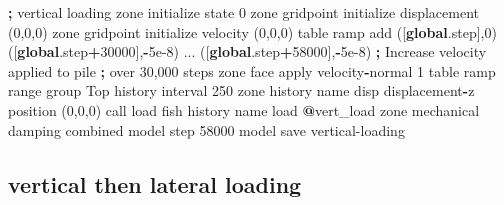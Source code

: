 \documentclass[a4paper, nobind]{templates/ociamthesis}
\newenvironment{Shaded}{\begin{snugshade}}{\end{snugshade}}
\newcommand{\BuiltInTok}[1]{#1}
\newcommand{\DecValTok}[1]{\textcolor[rgb]{0.00,0.00,0.81}{#1}}
\newcommand{\FloatTok}[1]{\textcolor[rgb]{0.00,0.00,0.81}{#1}}
\newcommand{\KeywordTok}[1]{\textcolor[rgb]{0.13,0.29,0.53}{\textbf{#1}}}
\newcommand{\NormalTok}[1]{#1}
\newcommand{\OperatorTok}[1]{\textcolor[rgb]{0.81,0.36,0.00}{\textbf{#1}}}
\newcommand{\StringTok}[1]{\textcolor[rgb]{0.31,0.60,0.02}{#1}}
\renewenvironment{Shaded}
{
  \vspace{10pt}%
  \begin{snugshade}%
}{%
  \end{snugshade}%
  \vspace{8pt}%
}
\begin{document}
\begin{Shaded}
\begin{Highlighting}[]
\OperatorTok{;}\NormalTok{ vertical loading}
\NormalTok{zone initialize state }\DecValTok{0}
\NormalTok{zone gridpoint initialize displacement (}\DecValTok{0}\NormalTok{,}\DecValTok{0}\NormalTok{,}\DecValTok{0}\NormalTok{)}
\NormalTok{zone gridpoint initialize velocity     (}\DecValTok{0}\NormalTok{,}\DecValTok{0}\NormalTok{,}\DecValTok{0}\NormalTok{) }
\NormalTok{table }\StringTok{\textquotesingle{}ramp\textquotesingle{}}\NormalTok{ add ([}\KeywordTok{global}\NormalTok{.step],}\DecValTok{0}\NormalTok{) ([}\KeywordTok{global}\NormalTok{.step}\OperatorTok{+}\DecValTok{30000}\NormalTok{],}\OperatorTok{{-}}\FloatTok{5e{-}8}\NormalTok{) ...}
\NormalTok{      ([}\KeywordTok{global}\NormalTok{.step}\OperatorTok{+}\DecValTok{58000}\NormalTok{],}\OperatorTok{{-}}\FloatTok{5e{-}8}\NormalTok{) }\OperatorTok{;}\NormalTok{ Increase velocity applied to pile}
                                  \OperatorTok{;}\NormalTok{ over }\DecValTok{30}\NormalTok{,}\DecValTok{000}\NormalTok{ steps}
\NormalTok{zone face }\BuiltInTok{apply}\NormalTok{ velocity}\OperatorTok{{-}}\NormalTok{normal }\DecValTok{1}\NormalTok{ table }\StringTok{\textquotesingle{}ramp\textquotesingle{}} \BuiltInTok{range}\NormalTok{ group }\StringTok{\textquotesingle{}Top\textquotesingle{}}
\NormalTok{history interval }\DecValTok{250}
\NormalTok{zone history name }\StringTok{\textquotesingle{}disp\textquotesingle{}}\NormalTok{ displacement}\OperatorTok{{-}}\NormalTok{z position (}\DecValTok{0}\NormalTok{,}\DecValTok{0}\NormalTok{,}\DecValTok{0}\NormalTok{)}
\NormalTok{call }\StringTok{\textquotesingle{}load\textquotesingle{}}
\NormalTok{fish history name }\StringTok{\textquotesingle{}load\textquotesingle{}} \OperatorTok{@}\NormalTok{vert\_load}
\NormalTok{zone mechanical damping combined}
\NormalTok{model step }\DecValTok{58000}
\NormalTok{model save }\StringTok{\textquotesingle{}vertical{-}loading\textquotesingle{}}
\end{Highlighting}
\end{Shaded}

\hypertarget{vertical-then-lateral-loading}{%
\subsection{vertical then lateral loading}\label{vertical-then-lateral-loading}}
\end{document}
